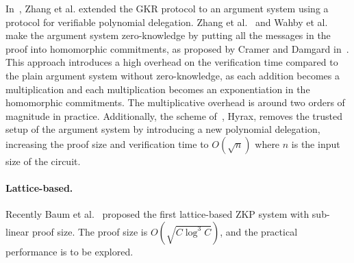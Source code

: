 In~\cite{zhang2017vsql}, Zhang et al. extended the GKR protocol to an argument system using a protocol for verifiable polynomial delegation. Zhang et al.~\cite{vram} and Wahby et al.~\cite{hyrax} make the argument system zero-knowledge by putting all the messages in the proof into homomorphic commitments, as proposed by Cramer and Damgard in~\cite{cramer1998zero}. This approach introduces a high overhead on the verification time compared to the plain argument system without zero-knowledge, as each addition becomes a multiplication and each multiplication becomes an exponentiation in the homomorphic commitments. The multiplicative overhead is around two orders of magnitude in practice. Additionally, the scheme of~\cite{hyrax}, \textsf{Hyrax}, removes the trusted setup of the argument system by introducing a new polynomial delegation, increasing the proof size and verification time to $O(\sqrt{n})$ where $n$ is the input size of the circuit. 

\paragraph{Lattice-based.} Recently Baum et al.~\cite{baum2018sub} proposed the first lattice-based ZKP system with sub-linear proof size. The proof size is $O(\sqrt{C\log^3C})$, and the practical performance is to be explored.